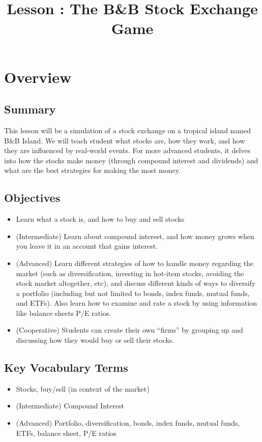 \documentclass{lessonplan}
\title{Lesson \lessonNumber: The B\&B Stock Exchange Game}
\author{\linkHome}
\date{}
\begin{document}
  \maketitle

  \section{Overview}
    \subsection{Summary}
      This lesson will be a simulation of a stock exchange on a tropical island named B\&B Island. 
      We will teach student what stocks are, how they work, and how they are influenced by real-world events.
      For more advanced students, it delves into how the stocks make money (through compound interest and dividends)
      and what are the best strategies for making the most money.

    \subsection{Objectives}
    \begin{itemize}
      \item Learn what a stock is, and how to buy and sell stocks
      \item (Intermediate) Learn about compound interest, and how money grows when you leave it in 
                an account that gains interest. 
      \item (Advanced) Learn different strategies of how to handle money regarding the market (such as 
               diversification, investing in hot-item stocks, avoiding the stock market altogether, etc), and discuss 
               different kinds of ways to diversify a portfolio (including but not limited to bonds, index funds, 
               mutual funds, and ETFs). Also learn how to examine and rate a stock by using information like balance sheets P/E ratios.
      \item (Cooperative) Students can create their own ``firms'' by grouping up and discussing how they would buy or sell their stocks.
    \end{itemize}
    \subsection{Key Vocabulary Terms}
    \begin{itemize}
      \item Stocks, buy/sell (in context of the market)
      \item (Intermediate) Compound Interest
      \item (Advanced) Portfolio, diversification, bonds, index funds, mutual funds, ETFs, balance sheet, P/E ratios
    \end{itemize}
\end{document}
